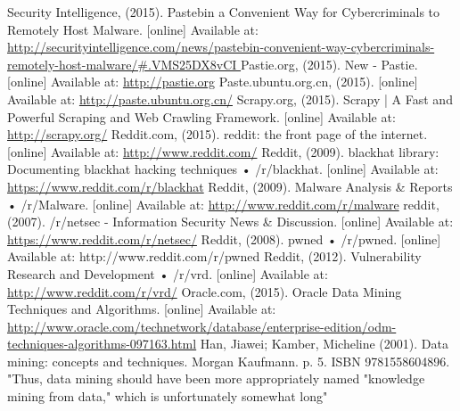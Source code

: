 \documentclass[12pt]{article}
\begin{document}
\begin{thebibliography}{99}
Security Intelligence, (2015). Pastebin a Convenient Way for Cybercriminals to Remotely Host Malware. [online] Available at: \url{http://securityintelligence.com/news/pastebin-convenient-way-cybercriminals-remotely-host-malware/#.VMS25DX8vCI }
Pastie.org, (2015). New - Pastie. [online] Available at: \url{http://pastie.org} 
 Paste.ubuntu.org.cn, (2015). [online] Available at: \url{http://paste.ubuntu.org.cn/}
Scrapy.org, (2015). Scrapy | A Fast and Powerful Scraping and Web Crawling Framework. [online] Available at: \url{http://scrapy.org/} 
Reddit.com, (2015). reddit: the front page of the internet. [online] Available at: \url{http://www.reddit.com/} 
Reddit, (2009). blackhat library: Documenting blackhat hacking techniques • /r/blackhat. [online] Available at: \url{https://www.reddit.com/r/blackhat}
Reddit, (2009). Malware Analysis \& Reports • /r/Malware. [online] Available at:   \url{http://www.reddit.com/r/malware}
reddit, (2007). /r/netsec - Information Security News \& Discussion. [online] Available at: \url{https://www.reddit.com/r/netsec/} 
Reddit, (2008). pwned • /r/pwned. [online] Available at: http://www.reddit.com/r/pwned 
Reddit, (2012). Vulnerability Research and Development • /r/vrd. [online] Available at: \url{http://www.reddit.com/r/vrd/}
Oracle.com, (2015). Oracle Data Mining Techniques and Algorithms. [online] Available at: \url{http://www.oracle.com/technetwork/database/enterprise-edition/odm-techniques-algorithms-097163.html}
Han, Jiawei; Kamber, Micheline (2001). Data mining: concepts and techniques. Morgan Kaufmann. p. 5. ISBN 9781558604896. "Thus, data mining should have been more appropriately named "knowledge mining from data," which is unfortunately somewhat long"
\end{thebibliography}
\end{document}
